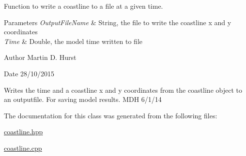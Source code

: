 Function to write a coastline to a file at a given time. 


\begin{DoxyParams}{Parameters}
{\em Output\-File\-Name} & String, the file to write the coastline x and y coordinates \\
\hline
{\em Time} & Double, the model time written to file \\
\hline
\end{DoxyParams}
\begin{DoxyAuthor}{Author}
Martin D. Hurst 
\end{DoxyAuthor}
\begin{DoxyDate}{Date}
28/10/2015
\end{DoxyDate}
Writes the time and a coastline x and y coordinates from the coastline object to an outputfile. For saving model results. M\-D\-H 6/1/14 

The documentation for this class was generated from the following files\-:\begin{DoxyCompactItemize}
\item 
\hyperlink{coastline_8hpp}{coastline.\-hpp}\item 
\hyperlink{coastline_8cpp}{coastline.\-cpp}\end{DoxyCompactItemize}
